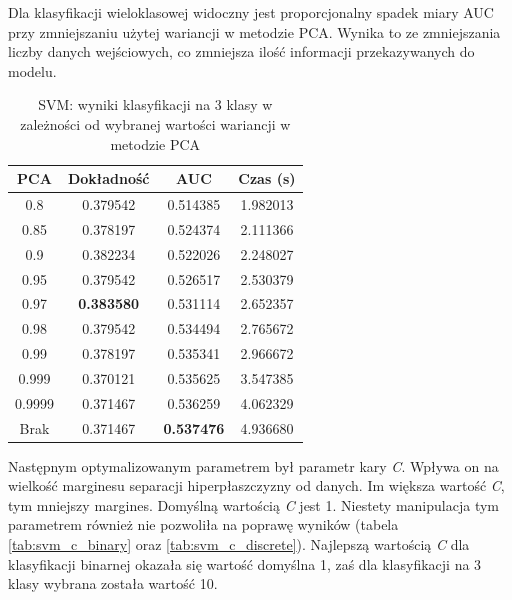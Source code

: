 \documentclass[a4paper, twoside, 11pt, openright]{article}
\begin{document}
Dla klasyfikacji wieloklasowej widoczny jest proporcjonalny spadek miary AUC przy zmniejszaniu użytej wariancji w metodzie PCA. Wynika to ze zmniejszania liczby danych wejściowych, co zmniejsza ilość informacji przekazywanych do modelu.

\begin{table}[H]
    \centering
    \begin{tabular}{|c|c|c|c|}
    \hline
        \textbf{PCA} & \textbf{Dokładność} &  \textbf{AUC} &  \textbf{Czas (s)} \\ \hline
0.8                &  0.379542 &  0.514385 &    1.982013 \\ \hline
0.85               &  0.378197 &  0.524374 &    2.111366 \\ \hline
0.9                &  0.382234 &  0.522026 &    2.248027 \\ \hline
0.95               &  0.379542 &  0.526517 &    2.530379 \\ \hline
0.97               &  \textbf{0.383580} &  0.531114 &    2.652357 \\ \hline
0.98               &  0.379542 &  0.534494 &    2.765672 \\ \hline
0.99               &  0.378197 &  0.535341 &    2.966672 \\ \hline
0.999			   &  0.370121 &  0.535625 &    3.547385 \\ \hline
0.9999             &  0.371467 &  0.536259 &    4.062329 \\ \hline
Brak                &  0.371467 &  \textbf{0.537476} &    4.936680 \\ \hline
    \end{tabular}
    \caption{SVM: wyniki klasyfikacji na 3 klasy w zależności od wybranej wartości wariancji w metodzie PCA}
    \label{tab:svm_pca_discrete}
\end{table}


Następnym optymalizowanym parametrem był parametr kary \textit{C}. Wpływa on na wielkość marginesu separacji hiperpłaszczyzny od danych. Im większa wartość \textit{C}, tym mniejszy margines. Domyślną wartością \textit{C} jest 1. Niestety manipulacja tym parametrem również nie pozwoliła na poprawę wyników (tabela \ref{tab:svm_c_binary} oraz \ref{tab:svm_c_discrete}). Najlepszą wartością \textit{C} dla klasyfikacji binarnej okazała się wartość domyślna 1, zaś dla klasyfikacji na 3 klasy wybrana została wartość 10. 
\end{document}
